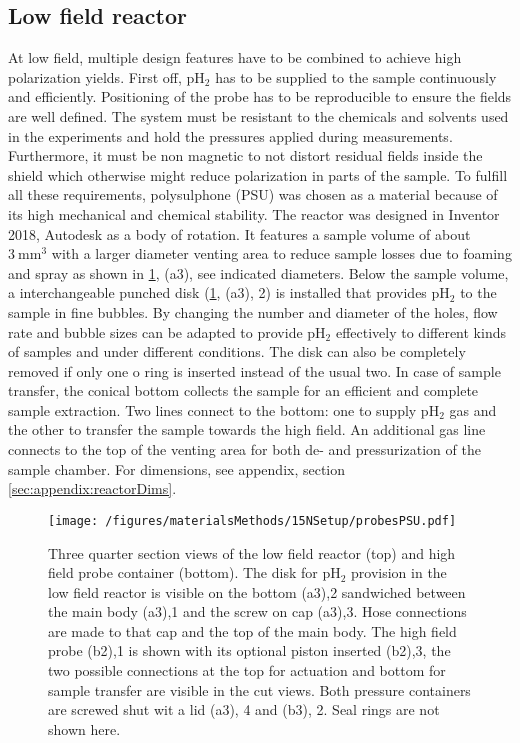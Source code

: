         \subsection{Low field reactor}
        \label{sec:matMeth:lowFieldReactor}
        At low field, multiple design features have to be combined to achieve high polarization yields.  First off, pH$_2$ has to be supplied to the sample continuously and efficiently. Positioning of the probe has to be reproducible to ensure the fields are well defined.  The system must be resistant to the chemicals and solvents used in the experiments and hold the pressures applied during measurements.  Furthermore, it must be non magnetic to not distort residual fields inside the shield which otherwise might reduce polarization in parts of the sample. To fulfill all these requirements, polysulphone (PSU) was chosen as a material because of its high mechanical and chemical stability.  The reactor was designed in Inventor 2018, Autodesk as a body of rotation. It features a sample volume of about $\SI{3}{\mm\cubed}$ with a larger diameter venting area to reduce sample losses due to foaming and spray as shown in \ref{figure:materialsMethods:probesPSU}, (a3), see indicated diameters. Below the sample volume, a interchangeable punched disk (\ref{figure:materialsMethods:probesPSU}, (a3), 2) is installed that provides pH$_2$ to the sample in fine bubbles. By changing the number and diameter of the holes, flow rate and bubble sizes can be adapted to provide pH$_2$ effectively to different kinds of samples and under different conditions. The disk can also be completely removed if only one o ring is inserted instead of the usual two. In case of sample transfer, the conical bottom collects the sample for an efficient and complete sample extraction.  Two lines connect to the bottom: one to supply pH$_2$ gas and the other to transfer the sample towards the high field.  An additional gas line connects to the top of the venting area for both de- and pressurization of the sample chamber.
        For dimensions, see appendix, section \ref{sec:appendix:reactorDims}.
            \begin{figure}
                \centering
                \texttt{[image: /figures/materialsMethods/15NSetup/probesPSU.pdf]}
                \caption[Reactor gemometry]{Three quarter section views of the low field reactor (top) and high field probe container (bottom). The disk for pH$_2$ provision in the low field reactor is visible on the bottom (a3),2 sandwiched between the main body (a3),1 and the screw on cap (a3),3.  Hose connections are made to that cap and the top of the main body. The high field probe (b2),1 is shown with its optional piston inserted (b2),3, the two possible connections at the top for actuation and bottom for sample transfer are visible in the cut views. Both pressure containers are screwed shut wit a lid (a3), 4 and (b3), 2. Seal rings are not shown here.}
                \label{figure:materialsMethods:probesPSU}
            \end{figure}
